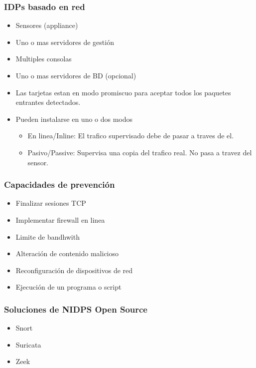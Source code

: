 \documentclass[11pt]{article}
\begin{document}
\subsubsection{IDPs basado en red}
\label{sec:org999b409}
\begin{itemize}
\item Sensores (appliance)
\item Uno o mas servidores de gestión
\item Multiples consolas
\item Uno o mas servidores de BD (opcional)

\item Las tarjetas estan en modo promiscuo para aceptar todos los paquetes entrantes detectados.

\item Pueden instalarse en uno o dos modos
\begin{itemize}
\item En linea/Inline: El trafico supervisado debe de pasar a traves de el.
\item Pasivo/Passive: Supervisa una copia del trafico real. No pasa a travez del sensor.
\end{itemize}
\end{itemize}
\subsubsection{Capacidades de prevención}
\label{sec:org1605518}
\begin{itemize}
\item Finalizar sesiones TCP
\item Implementar firewall en linea
\item Limite de bandhwith
\item Alteración de contenido malicioso
\item Reconfiguración de dispositivos de red
\item Ejecución de un programa o script
\end{itemize}
\subsubsection{Soluciones de NIDPS Open Source}
\label{sec:org13479d3}
\begin{itemize}
\item Snort
\item Suricata
\item Zeek
\end{itemize}
\end{document}

